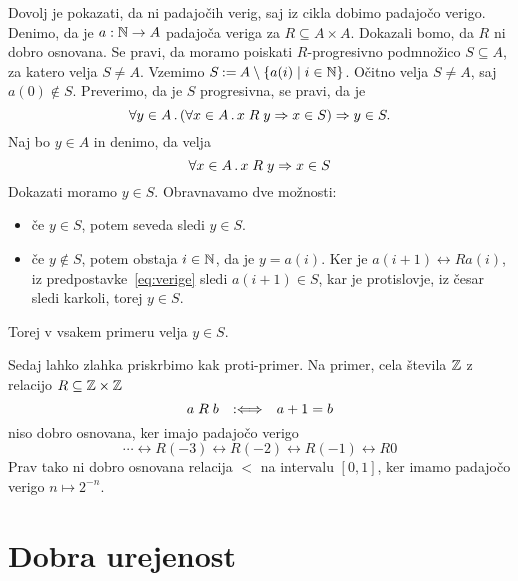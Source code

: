\begin{dokaz}
  Dovolj je pokazati, da ni padajočih verig, saj iz cikla dobimo padajočo verigo.
  Denimo, da je $a : \mathbb{N} \to A$ padajoča veriga za $R \subseteq A \times A$. Dokazali bomo, da $R$ ni dobro
  osnovana. Se pravi, da moramo poiskati $R$-progresivno podmnožico $S \subseteq A$, za katero velja
  $S \neq A$. Vzemimo $S \mathbin{{:}{=}} A \setminus \left\{ a(i) \mid i \in \mathbb{N}\right\}$. Očitno velja $S \neq A$, saj 
  $a(0) \not\in S$. Preverimo, da je $S$ progresivna, se pravi, da je
  \begin{equation*}
    \forall y \in A \,.\, (\forall x \in A \,.\, x \mathrel{R} y \Rightarrow x \in S) \Rightarrow y \in S.
  \end{equation*}
  Naj bo $y \in A$ in denimo, da velja
  \begin{equation}
    \label{eq:verige}
    \forall x \in A \,.\, x \mathrel{R} y \Rightarrow x \in S
  \end{equation}
  Dokazati moramo $y \in S$. Obravnavamo dve možnosti:
  \begin{itemize}
  \item če $y \in S$, potem seveda sledi $y \in S$.
  \item če $y \not\in S$, potem obstaja $i \in \mathbb{N}$, da je $y = a(i)$. Ker je $a(i+1) \rel{R} a(i)$, iz
    predpostavke~\eqref{eq:verige} sledi $a(i+1) \in S$, kar je protislovje, iz česar sledi karkoli, torej $y \in S$.
  \end{itemize}
  Torej v vsakem primeru velja $y \in S$.
\end{dokaz}

\begin{primer}
  Sedaj lahko zlahka priskrbimo kak proti-primer. Na primer, cela števila $\mathbb{Z}$ z relacijo $R \subseteq \mathbb{Z} \times \mathbb{Z}$
  \begin{equation*}
    a \mathrel{R} b \quad {{:}{\Longleftrightarrow}}\quad a + 1 = b
  \end{equation*}
  niso dobro osnovana, ker imajo padajočo verigo
  \begin{equation*}
    \cdots \rel{R} (-3) \rel{R} (-2) \rel{R} (-1) \rel{R} 0
  \end{equation*}
  Prav tako ni dobro osnovana relacija $<$ na intervalu $[0,1]$, ker imamo padajočo verigo
  $n \mapsto 2^{-n}$.
\end{primer}

\section{Dobra urejenost}

